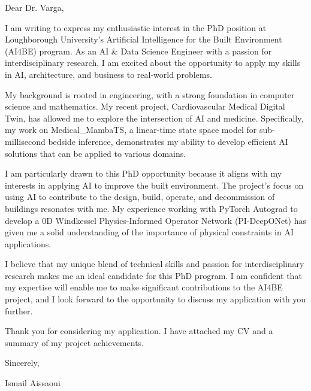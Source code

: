 \documentclass{letter}
\begin{document}
\opening{Dear Dr. Varga,}

I am writing to express my enthusiastic interest in the PhD position at Loughborough University's Artificial Intelligence for the Built Environment (AI4BE) program. As an AI & Data Science Engineer with a passion for interdisciplinary research, I am excited about the opportunity to apply my skills in AI, architecture, and business to real-world problems.

My background is rooted in engineering, with a strong foundation in computer science and mathematics. My recent project, Cardiovascular Medical Digital Twin, has allowed me to explore the intersection of AI and medicine. Specifically, my work on Medical_MambaTS, a linear-time state space model for sub-millisecond bedside inference, demonstrates my ability to develop efficient AI solutions that can be applied to various domains.

I am particularly drawn to this PhD opportunity because it aligns with my interests in applying AI to improve the built environment. The project's focus on using AI to contribute to the design, build, operate, and decommission of buildings resonates with me. My experience working with PyTorch Autograd to develop a 0D Windkessel Physics-Informed Operator Network (PI-DeepONet) has given me a solid understanding of the importance of physical constraints in AI applications.

I believe that my unique blend of technical skills and passion for interdisciplinary research makes me an ideal candidate for this PhD program. I am confident that my expertise will enable me to make significant contributions to the AI4BE project, and I look forward to the opportunity to discuss my application with you further.

Thank you for considering my application. I have attached my CV and a summary of my project achievements.

Sincerely,

Ismail Aissaoui

\closing{}
\end{document}
